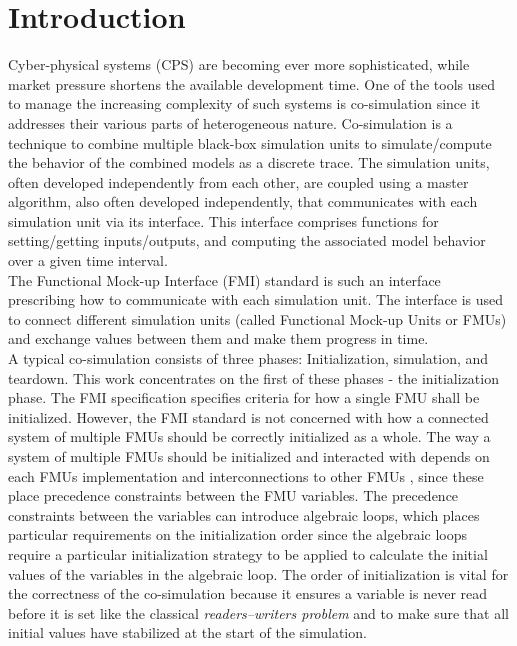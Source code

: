 \section{Introduction}\label{sc:introduction}
Cyber-physical systems (CPS) are becoming ever more sophisticated, while market pressure shortens the available development time. One of the tools used to manage the increasing complexity of such systems is co-simulation since it addresses their various parts of heterogeneous nature. Co-simulation is a technique to combine multiple black-box simulation units to simulate/compute the behavior of the combined models as a discrete trace\cite{Kubler2000}. The simulation units, often developed independently from each other, are coupled using a master algorithm, also often developed independently, that communicates with each simulation unit via its interface. This interface comprises functions for setting/getting inputs/outputs, and computing the associated model behavior over a given time interval. \\
The Functional Mock-up Interface (FMI) standard \cite{Blochwitz2012, fmi_2019} is such an interface prescribing how to communicate with each simulation unit. The interface is used to connect different simulation units (called Functional Mock-up Units or FMUs) and exchange values between them and make them progress in time. \\

A typical co-simulation consists of three phases: Initialization, simulation, and teardown. This work concentrates on the first of these phases - the initialization phase. The FMI specification specifies criteria for how a single FMU shall be initialized. However, the FMI standard is not concerned with how a connected system of multiple FMUs should be correctly initialized as a whole. 
The way a system of multiple FMUs should be initialized and interacted with depends on each FMUs implementation and interconnections to other FMUs \cite{gomes_lucio_vangheluwe_2019}, since these place precedence constraints between the FMU variables. The precedence constraints between the variables can introduce algebraic loops, which places particular requirements on the initialization order since the algebraic loops require a particular initialization strategy to be applied to calculate the initial values of the variables in the algebraic loop\cite{Bastian2011a}. The order of initialization is vital for the correctness of the co-simulation \cite{Thule2018} because it ensures a variable is never read before it is set like the classical \textit{readers–writers problem} and to make sure that all initial values have stabilized at the start of the simulation. 

